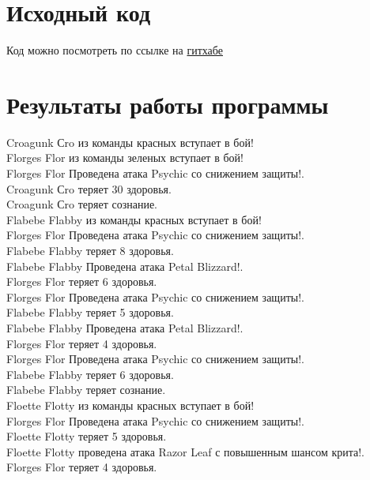 \section{Исходный код}
Код можно посмотреть по ссылке на \hyperlink{https://github.com/evgrart/1year/tree/main/Lab2/src}{гитхабе}
\section{Результаты работы программы}
Croagunk Сro из команды красных вступает в бой! \\
Florges Flor из команды зеленых вступает в бой! \\
Florges Flor Проведена атака Psychic со снижением защиты!. \\
Croagunk Сro теряет 30 здоровья. \\
Croagunk Сro теряет сознание. \\
Flabebe Flabby из команды красных вступает в бой! \\
Florges Flor Проведена атака Psychic со снижением защиты!. \\
Flabebe Flabby теряет 8 здоровья. \\

\noindent Flabebe Flabby Проведена атака Petal Blizzard!. \\
Florges Flor теряет 6 здоровья. \\

\noindent Florges Flor Проведена атака Psychic со снижением защиты!. \\ 
Flabebe Flabby теряет 5 здоровья. \\

\noindent Flabebe Flabby Проведена атака Petal Blizzard!. \\
Florges Flor теряет 4 здоровья. \\

\noindent Florges Flor Проведена атака Psychic со снижением защиты!. \\
Flabebe Flabby теряет 6 здоровья. \\
Flabebe Flabby теряет сознание. \\
Floette Flotty из команды красных вступает в бой! \\
Florges Flor Проведена атака Psychic со снижением защиты!. \\
Floette Flotty теряет 5 здоровья. \\

\noindent Floette Flotty проведена атака Razor Leaf с повышенным шансом крита!.  \\
Florges Flor теряет 4 здоровья. \\

